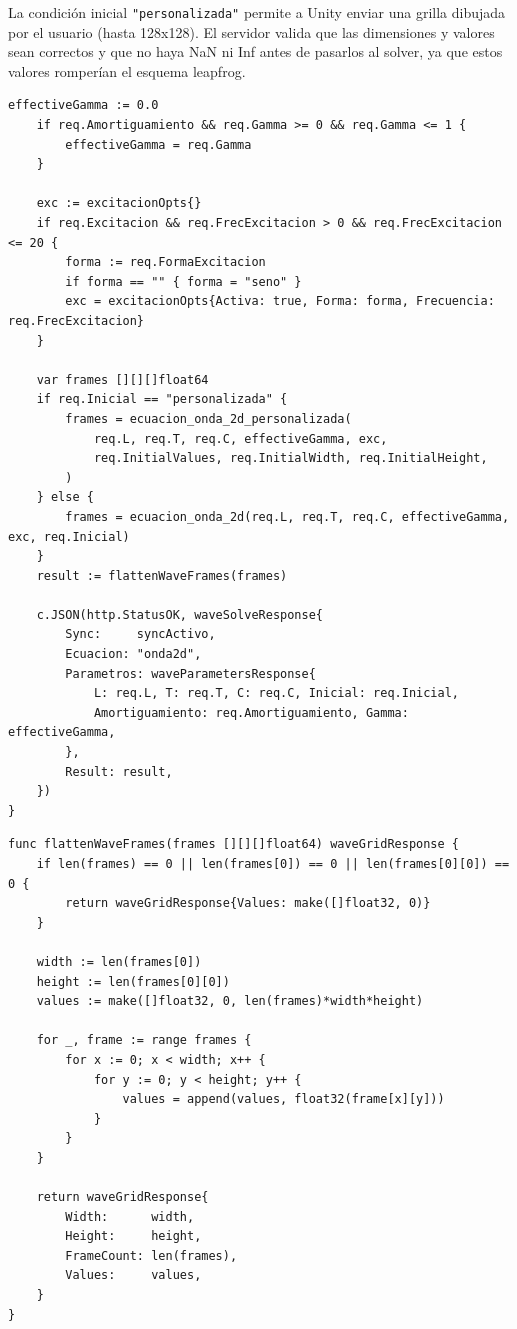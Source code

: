 \documentclass[12pt, a4paper]{article}
\begin{document}
La condición inicial \texttt{"personalizada"} permite a Unity enviar una grilla
dibujada por el usuario (hasta 128x128). El servidor valida que las dimensiones y
valores sean correctos y que no haya NaN ni Inf antes de pasarlos al solver, ya que
estos valores romperían el esquema leapfrog.

\begin{lstlisting}[style=golang, caption={Cálculo y construcción de la respuesta de onda}]
    effectiveGamma := 0.0
    if req.Amortiguamiento && req.Gamma >= 0 && req.Gamma <= 1 {
        effectiveGamma = req.Gamma
    }

    exc := excitacionOpts{}
    if req.Excitacion && req.FrecExcitacion > 0 && req.FrecExcitacion <= 20 {
        forma := req.FormaExcitacion
        if forma == "" { forma = "seno" }
        exc = excitacionOpts{Activa: true, Forma: forma, Frecuencia: req.FrecExcitacion}
    }

    var frames [][][]float64
    if req.Inicial == "personalizada" {
        frames = ecuacion_onda_2d_personalizada(
            req.L, req.T, req.C, effectiveGamma, exc,
            req.InitialValues, req.InitialWidth, req.InitialHeight,
        )
    } else {
        frames = ecuacion_onda_2d(req.L, req.T, req.C, effectiveGamma, exc, req.Inicial)
    }
    result := flattenWaveFrames(frames)

    c.JSON(http.StatusOK, waveSolveResponse{
        Sync:     syncActivo,
        Ecuacion: "onda2d",
        Parametros: waveParametersResponse{
            L: req.L, T: req.T, C: req.C, Inicial: req.Inicial,
            Amortiguamiento: req.Amortiguamiento, Gamma: effectiveGamma,
        },
        Result: result,
    })
}
\end{lstlisting}

\begin{lstlisting}[style=golang, caption={Aplanamiento de frames para Unity}]
func flattenWaveFrames(frames [][][]float64) waveGridResponse {
    if len(frames) == 0 || len(frames[0]) == 0 || len(frames[0][0]) == 0 {
        return waveGridResponse{Values: make([]float32, 0)}
    }

    width := len(frames[0])
    height := len(frames[0][0])
    values := make([]float32, 0, len(frames)*width*height)

    for _, frame := range frames {
        for x := 0; x < width; x++ {
            for y := 0; y < height; y++ {
                values = append(values, float32(frame[x][y]))
            }
        }
    }

    return waveGridResponse{
        Width:      width,
        Height:     height,
        FrameCount: len(frames),
        Values:     values,
    }
}
\end{lstlisting}
\end{document}
